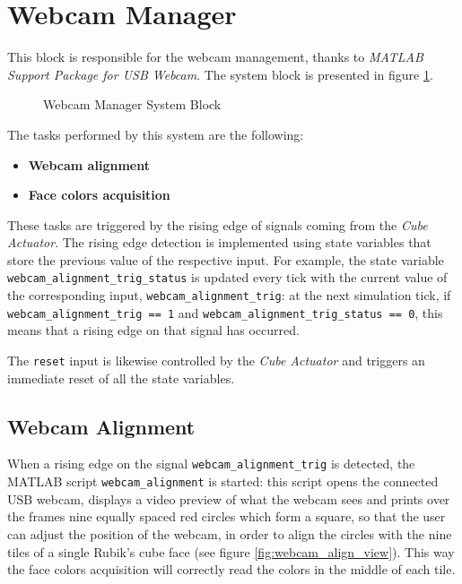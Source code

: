 \documentclass{report}
\begin{document}
\section{Webcam Manager} \label{sec:web-man}
This block is responsible for the webcam management, thanks to \textit{MATLAB Support Package for USB Webcam}. The system block is presented in figure \ref{fig:webcam_manager_block}.

\begin{figure}[h!]
    \centering
    
    \caption{Webcam Manager System Block}
    \label{fig:webcam_manager_block}
\end{figure}

The tasks performed by this system are the following:
\begin{itemize}
    \item \textbf{Webcam alignment}
    \item \textbf{Face colors acquisition}
\end{itemize}

These tasks are triggered by the rising edge of signals coming from the \textit{Cube Actuator}. The rising edge detection is implemented using state variables that store the previous value of the respective input. For example, the state variable \texttt{webcam\_alignment\_trig\_status} is updated every tick with the current value of the corresponding input, \texttt{webcam\_alignment\_trig}: at the next simulation tick, if \texttt{webcam\_alignment\_trig == 1} and \texttt{webcam\_alignment\_trig\_status == 0}, this means that a rising edge on that signal has occurred.

The \texttt{reset} input is likewise controlled by the \textit{Cube Actuator} and triggers an immediate reset of all the state variables.

\subsection{Webcam Alignment} \label{sub_sec:web-ali}
When a rising edge on the signal \texttt{webcam\_alignment\_trig} is detected, the MATLAB script \texttt{webcam\_alignment} is started: this script opens the connected USB webcam, displays a video preview of what the webcam sees and prints over the frames nine equally spaced red circles which form a square, so that the user can adjust the position of the webcam, in order to align the circles with the nine tiles of a single Rubik's cube face (see figure \ref{fig:webcam_align_view}). This way the face colors acquisition will correctly read the colors in the middle of each tile.
\end{document}
